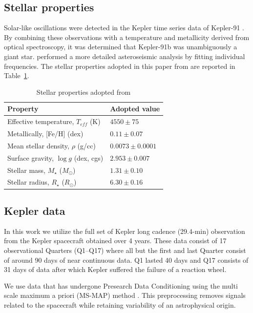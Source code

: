 \documentclass[apjl]{emulateapj}
\begin{document}
\subsection{Stellar properties}
Solar-like oscillations were detected in the Kepler time series data of Kepler-91 \citep{huber13}. By combining these observations with a temperature and metallicity derived from optical spectroscopy, it was determined that Kepler-91b was unambiguously a giant star. \citet{lillo14} performed a more detailed asteroseismic analysis by fitting individual frequencies. The stellar properties adopted in this paper from \citeauthor{lillo14} are reported in Table~\ref{tab:stellar}.

\begin{table}
\centering
\caption{Stellar properties adopted from \citet{lillo14}}\label{tab:stellar}
\begin{tabular}{l l }
Property & Adopted value \\
\hline
Effective temperature, $T_{eff}$ (K)		&	$4550\pm75$ \\
Metallically, [Fe/H] (dex)				& 	$0.11 \pm0.07$\\
Mean stellar density, $\rho$ (g/cc)		&	$0.0073 \pm0.0001$ \\
Surface gravity, $\log{g}$ (dex, cgs)		&	$2.953 \pm 0.007$ \\
Stellar mass, $M_\star$ ($M_\odot$)		&	$1.31 \pm 0.10$\\
Stellar radius, $R_\star$ ($R_\odot$)		&	$6.30 \pm 0.16$ \\
\hline
\end{tabular}
\end{table}


\subsection{Kepler data}
In this work we utilize the full set of Kepler long cadence (29.4-min) observation from the Kepler spacecraft obtained over 4 years. These data consist of 17 observational Quarters  (Q1--Q17) where all but the first and last Quarter consist of around 90 days of near continuous data. Q1 lasted 40 days and Q17 consists of 31 days of data after which Kepler suffered the failure of a reaction wheel.

We use data that has undergone Presearch Data Conditioning \citep{stumpe12,smith12} using the multi scale maximum a priori (MS-MAP) method \citep{stumpe14}. This preprocessing removes signals related to the spacecraft while retaining variability of an astrophysical origin.
\end{document}
